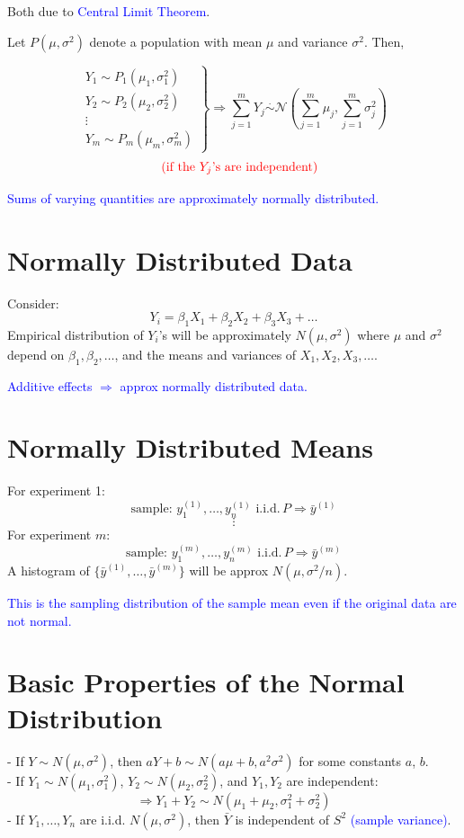 \documentclass[14pt]{extarticle}
\begin{document}
Both due to \textcolor{blue}{Central Limit Theorem}. 

Let \( P(\mu, \sigma^2) \) denote a population with mean \( \mu \) and variance \( \sigma^2 \). Then,

\[
\left.
\begin{array}{l}
Y_1 \sim P_1(\mu_1, \sigma_1^2) \\
Y_2 \sim P_2(\mu_2, \sigma_2^2) \\
\vdots \\
Y_m \sim P_m(\mu_m, \sigma_m^2)
\end{array}
\right\}
\Rightarrow \sum_{j=1}^{m} Y_j \overset{\cdot}{\sim} \mathcal{N} \left( \sum_{j=1}^{m} \mu_j, \sum_{j=1}^{m} \sigma_j^2 \right)
\]
\[\quad \textcolor{red}{\text{(if the $Y_j$'s are independent)}}
\]

\textcolor{blue}{Sums of varying quantities are approximately normally distributed.}

\section*{Normally Distributed Data}
Consider:
\[
Y_i = \beta_1 X_1 + \beta_2 X_2 + \beta_3 X_3 + \dots
\]
Empirical distribution of \( Y_i \)'s will be approximately \( N(\mu, \sigma^2) \) where \( \mu \) and \( \sigma^2 \) depend on \( \beta_1, \beta_2, \dots \), and the means and variances of \( X_1, X_2, X_3, \dots \).

\textcolor{blue}{Additive effects \( \Rightarrow \) approx normally distributed data.}

\section*{Normally Distributed Means}
For experiment 1:
\[
\text{sample: } y_1^{(1)}, \dots, y_n^{(1)} \text{ i.i.d.} \, P \Rightarrow \bar{y}^{(1)}
\]
\[\vdots\]
For experiment \( m \):
\[
\text{sample: } y_1^{(m)}, \dots, y_n^{(m)} \text{ i.i.d.} \, P \Rightarrow \bar{y}^{(m)}
\]
A histogram of \( \{ \bar{y}^{(1)}, \dots, \bar{y}^{(m)} \} \) will be approx \( N(\mu, \sigma^2/n) \).

\textcolor{blue}{This is the sampling distribution of the sample mean even if the original data are not normal.}

\section*{Basic Properties of the Normal Distribution}
- If \( Y \sim N(\mu, \sigma^2) \), then \( a Y + b \sim N(a \mu + b, a^2 \sigma^2) \) for some constants \( a \), \( b \). \\ 
- If \( Y_1 \sim N(\mu_1, \sigma_1^2) \), \( Y_2 \sim N(\mu_2, \sigma_2^2) \), and \( Y_1, Y_2 \) are independent:
\[
\Rightarrow Y_1 + Y_2 \sim N(\mu_1 + \mu_2, \sigma_1^2 + \sigma_2^2)
\]
- If \( Y_1, \dots, Y_n \) are i.i.d. \( N(\mu, \sigma^2) \), then \( \bar{Y} \) is independent of \( S^2 \) \textcolor{blue}{ (sample variance)}.
\end{document}
